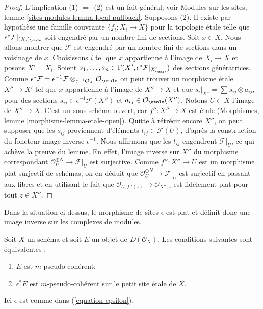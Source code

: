 \begin{proof}
L'implication (1) $\Rightarrow$ (2) est un fait g\'en\'eral; voir Modules sur
les sites, lemme \ref{sites-modules-lemma-local-pullback}.
Supposons (2). Il existe par hypoth\`ese une famille couvrante
$\{f_i : X_i \to X\}$ pour la topologie \'etale telle que
$\epsilon^*\mathcal{F}|_{(X_i)_\etale}$ soit engendr\'e par un nombre fini de
sections. Soit $x \in X$. Nous allons montrer que $\mathcal{F}$ est engendr\'e
par un nombre fini de sections dans un voisinage de $x$.
Choisissons $i$ tel que $x$ appartienne \`a l'image de $X_i \to X$ et posons
$X' = X_i$. Soient
$s_1, \ldots, s_n \in
\Gamma(X', \epsilon^*\mathcal{F}|_{X'_\etale})$
des sections g\'en\'eratrices. Comme
$\epsilon^*\mathcal{F} =
\epsilon^{-1}\mathcal{F} \otimes_{\epsilon^{-1}\mathcal{O}_X}
\mathcal{O}_\etale$
on peut trouver un morphisme \'etale $X'' \to X'$ tel que $x$ appartienne
\`a l'image de $X'' \to X$ et que
$s_i|_{X''} = \sum s_{ij} \otimes a_{ij}$, pour des sections
$s_{ij} \in \epsilon^{-1}\mathcal{F}(X'')$ et
$a_{ij} \in \mathcal{O}_\etale(X'')$. Notons $U \subset X$ l'image de
$X'' \to X$. C'est un sous-sch\'ema ouvert, car $f'' : X'' \to X$ est \'etale
(Morphismes, lemme \ref{morphisms-lemma-etale-open}). Quitte \`a r\'etr\'ecir
encore $X''$, on peut supposer que les $s_{ij}$ proviennent d'\'el\'ements
$t_{ij} \in \mathcal{F}(U)$, d'apr\`es la construction du foncteur image
inverse $\epsilon^{-1}$. Nous affirmons que les $t_{ij}$ engendrent
$\mathcal{F}|_U$, ce qui ach\`eve la preuve du lemme. En effet, l'image inverse
sur $X''$ du morphisme correspondant
$\mathcal{O}_U^{\oplus N} \to \mathcal{F}|_U$ est surjective. Comme
$f'' : X'' \to U$ est un morphisme plat surjectif de sch\'emas, on en d\'eduit
que $\mathcal{O}_U^{\oplus N} \to \mathcal{F}|_U$ est surjectif en passant
aux fibres et en utilisant le fait que
$\mathcal{O}_{U, f''(z)} \to \mathcal{O}_{X'', z}$
est fid\`element plat pour tout $z \in X''$.
\end{proof}

\noindent
Dans la situation ci-dessus, le morphisme de sites $\epsilon$ est plat et
d\'efinit donc une image inverse sur les complexes de modules.

\begin{lemma}
\label{lemma-descend-pseudo-coherent}
Soit $X$ un sch\'ema et soit $E$ un objet de $D(\mathcal{O}_X)$.
Les conditions suivantes sont \'equivalentes :
\begin{enumerate}
\item $E$ est $m$-pseudo-coh\'erent;
\item $\epsilon^*E$ est $m$-pseudo-coh\'erent sur le petit site \'etale de $X$.
\end{enumerate}
Ici $\epsilon$ est comme dans (\ref{equation-epsilon}).
\end{lemma}

